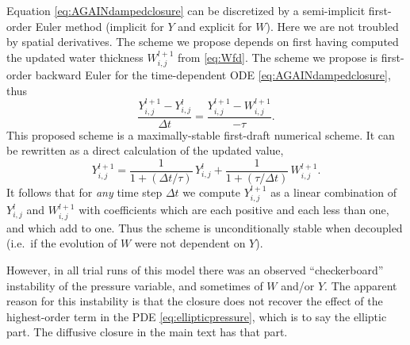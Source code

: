 \documentclass[12pt,final]{amsart}%
\begin{document}
Equation \eqref{eq:AGAINdampedclosure} can be discretized by a semi-implicit first-order Euler method (implicit for $Y$ and explicit for $W$).  Here we are not troubled by spatial derivatives.  The scheme we propose depends on first having computed the updated water thickness $W_{i,j}^{l+1}$ from \eqref{eq:Wfd}.  The scheme we propose is first-order backward Euler \citep{BurdenFaires} for the time-dependent ODE \eqref{eq:AGAINdampedclosure}, thus
\begin{equation}
\frac{Y_{i,j}^{l+1} - Y_{i,j}^{l}}{\Delta t} = \frac{Y_{i,j}^{l+1} - W_{i,j}^{l+1}}{- \tau}. \label{eq:Yfd}
\end{equation}
This proposed scheme is a maximally-stable first-draft numerical scheme.  It can be rewritten as a direct calculation of the updated value,
   $$Y_{i,j}^{l+1} = \frac{1}{1 + (\Delta t/\tau)}\, Y_{i,j}^{l} + \frac{1}{1 + (\tau / \Delta t)}\, W_{i,j}^{l+1}.$$
It follows that for \emph{any} time step $\Delta t$ we compute $Y_{i,j}^{l+1}$ as a linear combination of $Y_{i,j}^{l}$ and $W_{i,j}^{l+1}$ with coefficients which are each positive and each less than one, and which add to one.  Thus the scheme is unconditionally stable when decoupled (i.e.~if the evolution of $W$ were not dependent on $Y$).

However, in all trial runs of this model there was an observed ``checkerboard'' instability of the pressure variable, and sometimes of $W$ and/or $Y$.  The apparent reason for this instability is that the closure does not recover the effect of the highest-order term in the PDE \eqref{eq:ellipticpressure}, which is to say the elliptic part.  The diffusive closure in the main text has that part.
\end{document}
